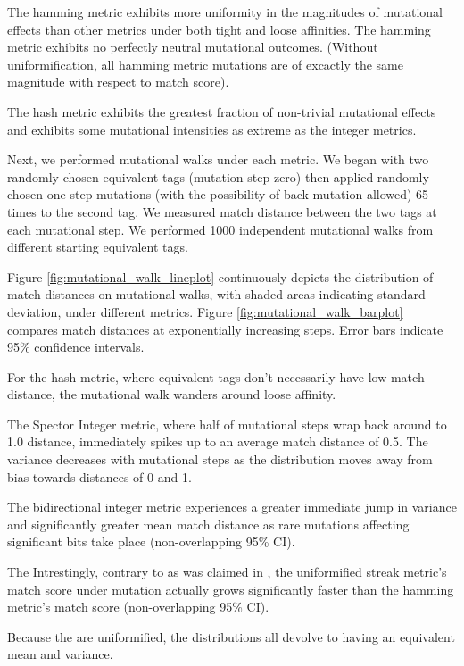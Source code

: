 The hamming metric exhibits more uniformity in the magnitudes of mutational effects than other metrics under both tight and loose affinities.
The hamming metric exhibits no perfectly neutral mutational outcomes.
(Without uniformification, all hamming metric mutations are of excactly the same magnitude with respect to match score).

The hash metric exhibits the greatest fraction of non-trivial mutational effects and exhibits some mutational intensities as extreme as the integer metrics.




Next, we performed mutational walks under each metric.
We began with two randomly chosen equivalent tags (mutation step zero) then applied randomly chosen one-step mutations (with the possibility of back mutation allowed) 65 times to the second tag.
We measured match distance between the two tags at each mutational step.
We performed 1000 independent mutational walks from different starting equivalent tags.

Figure \ref{fig:mutational_walk_lineplot} continuously depicts the distribution of match distances on mutational walks, with shaded areas indicating standard deviation, under different metrics.
Figure \ref{fig:mutational_walk_barplot} compares match distances at exponentially increasing steps.
Error bars indicate 95\% confidence intervals.

For the hash metric, where equivalent tags don't necessarily have low match distance, the mutational walk wanders around loose affinity.

The Spector Integer metric, where half of mutational steps wrap back around to 1.0 distance, immediately spikes up to an average match distance of 0.5.
The variance decreases with mutational steps as the distribution moves away from bias towards distances of 0 and 1.

The bidirectional integer metric experiences a greater immediate jump in variance and significantly greater mean match distance as rare mutations affecting significant bits take place (non-overlapping 95\% CI).

The
Intrestingly, contrary to as was claimed in \citep{downing2015intelligence}, the uniformified streak metric's match score under mutation actually grows significantly faster than the hamming metric's match score  (non-overlapping 95\% CI).

Because the are uniformified, the distributions all devolve to having an equivalent mean and variance.

